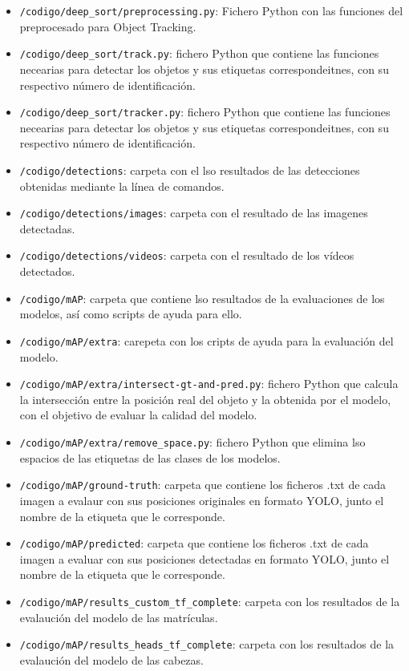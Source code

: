 \begin{itemize}
    \item \texttt{/codigo/deep\_sort/preprocessing.py}: Fichero Python con las funciones del preprocesado para Object Tracking.
    \item \texttt{/codigo/deep\_sort/track.py}: fichero Python que contiene las funciones necearias para detectar los objetos y sus etiquetas correspondeitnes, con su respectivo número de identificación.
    \item \texttt{/codigo/deep\_sort/tracker.py}: fichero Python que contiene las funciones necearias para detectar los objetos y sus etiquetas correspondeitnes, con su respectivo número de identificación.
    \item \texttt{/codigo/detections}: carpeta con el lso resultados de las detecciones obtenidas mediante la línea de comandos.
    \item \texttt{/codigo/detections/images}: carpeta con el resultado de las imagenes detectadas.
    \item \texttt{/codigo/detections/videos}: carpeta con el resultado de los vídeos detectados.
    \item \texttt{/codigo/mAP}: carpeta que contiene lso resultados de la evaluaciones de los modelos, así como scripts de ayuda para ello.
    \item \texttt{/codigo/mAP/extra}: carepeta con los cripts de ayuda para la evaluación del modelo.
    \item \texttt{/codigo/mAP/extra/intersect-gt-and-pred.py}: fichero Python que calcula la intersección entre la posición real del objeto y la obtenida por el modelo, con el objetivo de evaluar la calidad del modelo.
    \item \texttt{/codigo/mAP/extra/remove\_space.py}: fichero Python que elimina lso espacios de las etiquetas de las clases de los modelos.
    \item \texttt{/codigo/mAP/ground-truth}: carpeta que contiene los ficheros .txt de cada imagen a evalaur con sus posiciones originales en formato YOLO, junto el nombre de la etiqueta que le corresponde.
    \item \texttt{/codigo/mAP/predicted}: carpeta que contiene los ficheros .txt de cada imagen a evaluar con sus posiciones detectadas en formato YOLO, junto el nombre de la etiqueta que le corresponde.
    \item \texttt{/codigo/mAP/results\_custom\_tf\_complete}: carpeta con los resultados de la evalaución del modelo de las matrículas.
    \item \texttt{/codigo/mAP/results\_heads\_tf\_complete}: carpeta con los resultados de la evalaución del modelo de las cabezas.

\end{itemize}
